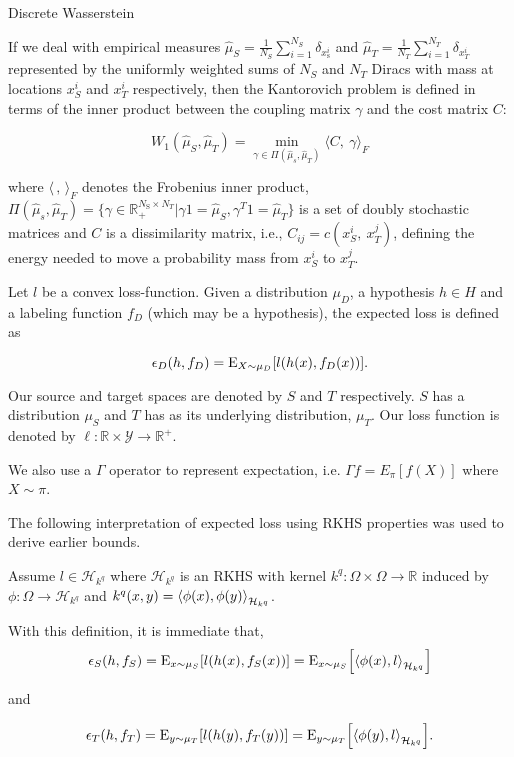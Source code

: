 \begin{definition}{Discrete Wasserstein} \cite{Redko2017}
	
	If we deal with empirical measures $\hat{\mu}_{S}=\frac{1}{N_{S}}\sum_{i=1}^{N_{S}}\delta_{x_{\mathrm{s}}^{i}}$ and $\hat{\mu}_{T}=\frac{1}{N_{T}}\sum_{i=1}^{N_{T}}\delta_{x_{T}^{i}}$ represented by the uniformly weighted sums of $N_{S}$ and $N_{T}$ Diracs with mass at locations $x_{S}^{i}$ and $x_{T}^{i}$ respectively, then the Kantorovich problem is defined in terms of the inner product between the coupling matrix $\gamma$ and the cost matrix $C$:
	
	$$
	W_{1}(\hat{\mu}_{S},\hat{\mu}_{T})=\min_{\gamma\in\Pi(\hat{\mu}_s,\hat{\mu}_{T})} \langle C,\ \gamma\rangle_{F}
	$$
	
	where $\langle \, , \, \rangle_F$ denotes the Frobenius inner product, $\Pi(\hat{\mu}_s,\hat{\mu}_{T})=\{\gamma\in \mathbb{R}_{+}^{N_{\mathrm{S}}\times N_{T}}|\gamma 1=\hat{\mu}_{S}, \gamma^{T}1= \hat{\mu}_{T}\}$ is a set of doubly stochastic matrices and $C$ is a dissimilarity matrix, i.e., $C_{ij}= c(x_{S}^{i},\ x_{T}^{j})$, defining the energy needed to move a probability mass from $x_{S}^{i}$ to $x_{T}^{j}$.
	
\end{definition}

\begin{definition}
	Let $l$ be a convex loss-function. Given a distribution $\mu_D$, a hypothesis $h\in H$ and a labeling function $f_D$ (which may be a hypothesis), the expected loss is defined as
	
	\[
	\epsilon_D(h,f_D) = \E_{X\sim \mu_D}[l(h(x),f_D(x))].
	\]
\end{definition}

\medskip

Our source and target spaces are denoted by $S$ and $T$ respectively. $S$ has a distribution $\mu_S$ and $T$ has as its underlying distribution, $\mu_T$. Our loss function is denoted by $\ell: \mathbb{R}\times \mathcal{Y}\to \mathbb{R}^{+}$.

We also use a $\Gamma$ operator to represent expectation, i.e. $\Gamma f = E_{\pi}[f(X)]$ where $X\sim \pi$.

\medskip


The following interpretation of expected loss using RKHS properties was used to derive earlier bounds.

\begin{definition}
	Assume $l \in \mathcal{H}_{k^q}$ where $\mathcal{H}_{k^q}$ is an RKHS with kernel $k^q: \Omega\times \Omega\to \mathbb{R}$ induced by $\phi: \Omega\to \mathcal{H}_{k^q}$ and $k^q(x,y) = \ang*{\phi(x),\phi(y)}_{\mathcal{H}_{k^q}}$.
	
	With this definition, it is immediate that,
	$$ \epsilon_S(h,f_S) = \E_{x\sim \mu_S}\bkt*{l(h(x),f_S(x))} = \E_{x\sim \mu_S}\bkt*{\ang*{\phi(x),l}_{\mathcal{H}_{k^q}}} $$
	
	and
	
	$$ \epsilon_T(h,f_T) = \E_{y\sim \mu_T}\bkt*{l(h(y),f_T(y))} = \E_{y\sim \mu_T}\bkt*{\ang*{\phi(y),l}_{\mathcal{H}_{k^q}}} .$$
\end{definition}

